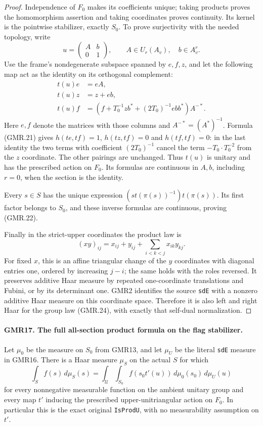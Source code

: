 \documentclass[11pt,a4paper]{article}
\numberwithin{equation}{section}
\theoremstyle{remark}\newtheorem{remark}[theorem]{Remark}
\begin{document}
\begin{proof}
Independence of $F_0$ makes its coefficients unique; taking products
proves the homomorphism assertion and taking coordinates proves
continuity.  Its kernel is the pointwise stabilizer, exactly $S_0$.
To prove surjectivity with the needed topology, write
\[
 u=\begin{pmatrix}A&b\\0&1\end{pmatrix},
 \qquad A\in U_r(A_v),\quad b\in A_v^r.
\]
Use the frame's nondegenerate subspace spanned by $e,f,z$, and let the
following map act as the identity on its orthogonal complement:
\[
\begin{split}
 t(u)e&=eA,\\
 t(u)z&=z+eb,\\
 t(u)f&=\left(f+T_0^{-1}z b^*
                  +(2T_0)^{-1}e b b^*\right)A^{-*}.
\end{split}
 \tag{GMR.23}
\]
Here $e,f$ denote the matrices with those columns and
$A^{-*}=(A^*)^{-1}$.  Formula (GMR.21) gives
$h(t e,t f)=1$, $h(tz,t f)=0$ and $h(t f,t f)=0$:
in the last identity the two terms with coefficient $(2T_0)^{-1}$
cancel the term $-T_0\cdot T_0^{-2}$ from the $z$ coordinate.
The other pairings are unchanged.  Thus $t(u)$ is unitary and has
the prescribed action on $F_0$.  Its formulas are continuous in
$A,b$, including $r=0$, when the section is the identity.

Every $s\in S$ has the unique expression
$(s t(\pi(s))^{-1})t(\pi(s))$.  Its first factor belongs to $S_0$,
and these inverse formulas are continuous, proving (GMR.22).

Finally in the strict-upper coordinates the product law is
\[
 (xy)_{ij}=x_{ij}+y_{ij}+\sum_{i<k<j}x_{ik}y_{kj}.
 \tag{GMR.24}
\]
For fixed $x$, this is an affine triangular change of the $y$
coordinates with diagonal entries one, ordered by increasing
$j-i$; the same holds with the roles reversed.  It preserves
additive Haar measure by repeated one-coordinate translations and
Fubini, or by its determinant one.  GMR2 identifies the source
\texttt{sd\allowbreak E} with a nonzero additive Haar measure on this coordinate
space.  Therefore it is also left and right Haar for the group law
(GMR.24), with exactly that self-dual normalization.
\end{proof}

\paragraph{GMR17. The full all-section product formula on the flag stabilizer.}
\label{claim:GMR17}
Let $\mu_0$ be the measure on $S_0$ from GMR13, and let $\mu_U$ be
the literal \texttt{sd\allowbreak E} measure in GMR16.  There is a Haar measure
$\mu_S$ on the actual $S$ for which
\[
 \int_S f(s)\,d\mu_S(s)
 =\int_{\mathcal U}\int_{S_0}f(s_0t'(u))\,d\mu_0(s_0)\,d\mu_U(u)
 \tag{GMR.25}
\]
for every nonnegative measurable function on the ambient unitary
group and every map $t'$ inducing the prescribed upper-unitriangular
action on $F_0$.  In particular this is the exact original
\texttt{Is\allowbreak Prod\allowbreak U}, with no measurability assumption on $t'$.
\end{document}
